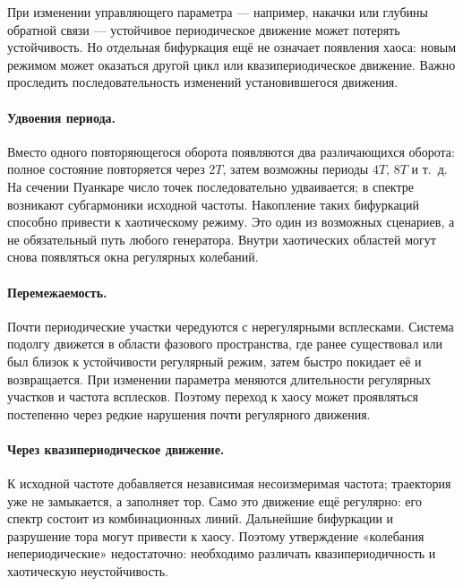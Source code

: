 При изменении управляющего параметра --- например, накачки или глубины обратной связи --- устойчивое периодическое движение может потерять устойчивость. Но отдельная бифуркация ещё не означает появления хаоса: новым режимом может оказаться другой цикл или квазипериодическое движение. Важно проследить последовательность изменений установившегося движения.

\paragraph{Удвоения периода.}
Вместо одного повторяющегося оборота появляются два различающихся оборота: полное состояние повторяется через $2T$, затем возможны периоды $4T$, $8T$ и т.~д. На сечении Пуанкаре число точек последовательно удваивается; в спектре возникают субгармоники исходной частоты. Накопление таких бифуркаций способно привести к хаотическому режиму. Это один из возможных сценариев, а не обязательный путь любого генератора. Внутри хаотических областей могут снова появляться окна регулярных колебаний.

\paragraph{Перемежаемость.}
Почти периодические участки чередуются с нерегулярными всплесками. Система подолгу движется в области фазового пространства, где ранее существовал или был близок к устойчивости регулярный режим, затем быстро покидает её и возвращается. При изменении параметра меняются длительности регулярных участков и частота всплесков. Поэтому переход к хаосу может проявляться постепенно через редкие нарушения почти регулярного движения.

\paragraph{Через квазипериодическое движение.}
К исходной частоте добавляется независимая несоизмеримая частота; траектория уже не замыкается, а заполняет тор. Само это движение ещё регулярно: его спектр состоит из комбинационных линий. Дальнейшие бифуркации и разрушение тора могут привести к хаосу. Поэтому утверждение «колебания непериодические» недостаточно: необходимо различать квазипериодичность и хаотическую неустойчивость.
